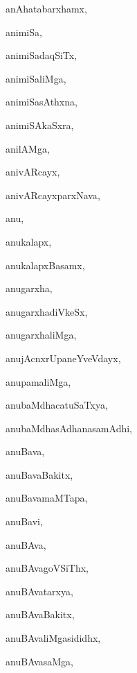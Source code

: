\begin{multicols}{3}
{\noindent
{anAhatabarxhamx}, \pageref{anAhatabarxhamx}

\noindent
{animiSa}, \pageref{animiSa}

\noindent
{animiSadaqSiTx}, \pageref{animiSadaqSiTx}

\noindent
{animiSaliMga}, \pageref{animiSaliMga}

\noindent
{animiSasAthxna}, \pageref{animiSasAthxna}

\noindent
{animiSAkaSxra}, \pageref{animiSAkaSxra}

\noindent
{anilAMga}, \pageref{anilAMga}

\noindent
{anivARcayx}, \pageref{anivARcayx}

\noindent
{anivARcayxparxNava}, \pageref{anivARcayxparxNava}

\noindent
{anu}, \pageref{anu}

\noindent
{anukalapx}, \pageref{anukalapx}

\noindent
{anukalapxBasamx}, \pageref{anukalapxBasamx}

\noindent
{anugarxha}, \pageref{anugarxha}

\noindent
{anugarxhadiVkeSx}, \pageref{anugarxhadiVkeSx}

\noindent
{anugarxhaliMga}, \pageref{anugarxhaliMga}

\noindent
{anujAcnxrUpaneYveVdayx}, \pageref{anujAcnxrUpaneYveVdayx}

\noindent
{anupamaliMga}, \pageref{anupamaliMga}

\noindent
{anubaMdhacatuSaTxya}, \pageref{anubaMdhacatuSaTxya}

\noindent
{anubaMdhasAdhanasamAdhi}, \pageref{anubaMdhasAdhanasamAdhi}

\noindent
{anuBava}, \pageref{anuBava}

\noindent
{anuBavaBakitx}, \pageref{anuBavaBakitx}

\noindent
{anuBavamaMTapa}, \pageref{anuBavamaMTapa}

\noindent
{anuBavi}, \pageref{anuBavi}

\noindent
{anuBAva}, \pageref{anuBAva}

\noindent
{anuBAvagoVSiThx}, \pageref{anuBAvagoVSiThx}

\noindent
{anuBAvatarxya}, \pageref{anuBAvatarxya}

\noindent
{anuBAvaBakitx}, \pageref{anuBAvaBakitx}

\noindent
{anuBAvaliMgasididhx}, \pageref{anuBAvaliMgasididhx}

\noindent
{anuBAvasaMga}, \pageref{anuBAvasaMga}

}
\end{multicols}
